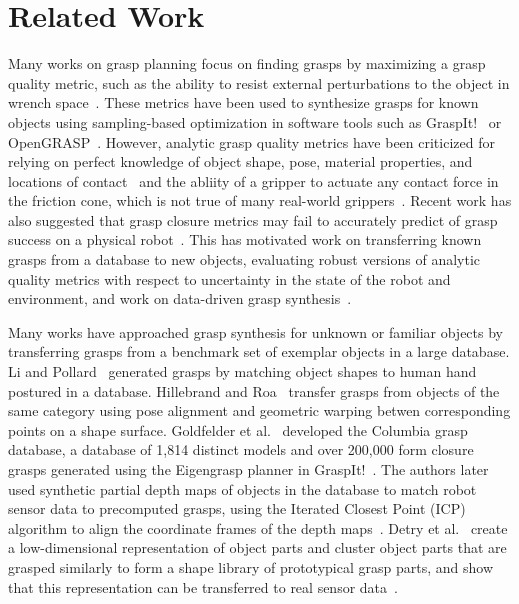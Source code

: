 \section{Related Work}

Many works on grasp planning focus on finding grasps by maximizing a grasp quality metric, such as the ability to resist external perturbations to the object in wrench space~\cite{ferrari1992, miller2004graspit}.
These metrics have been used to synthesize grasps for known objects using sampling-based optimization in software tools such as GraspIt!~\cite{miller2004graspit} or OpenGRASP~\cite{}.
However, analytic grasp quality metrics have been criticized for relying on perfect knowledge of object shape, pose, material properties, and locations of contact~\cite{cheong2011output} and the abliity of a gripper to actuate any contact force in the friction cone, which is not true of many real-world grippers~\cite{}.
Recent work has also suggested that grasp closure metrics may fail to accurately predict of grasp success on a physical robot~\cite{balasubmaranian, weisz}.
This has motivated work on transferring known grasps from a database to new objects, evaluating robust versions of analytic quality metrics with respect to uncertainty in the state of the robot and environment, and work on data-driven grasp synthesis~\cite{}.

Many works have approached grasp synthesis for unknown or familiar objects by transferring grasps from a benchmark set of exemplar objects in a large database.
Li and Pollard~\cite{} generated grasps by matching object shapes to human hand postured in a database.
Hillebrand and Roa~\cite{} transfer grasps from objects of the same category using pose alignment and geometric warping betwen corresponding points on a shape surface.
Goldfelder et al.~\cite{} developed the Columbia grasp database, a database of 1,814 distinct models and over 200,000 form closure grasps generated using the Eigengrasp planner in GraspIt!~\cite{ciocarlie2009}.
The authors later used synthetic partial depth maps of objects in the database to match robot sensor data to precomputed grasps, using the Iterated Closest Point (ICP) algorithm to align the coordinate frames of the depth maps~\cite{partial}.
Detry et al.~\cite{91inbohg} create a low-dimensional representation of object parts and cluster object parts that are grasped similarly to form a shape library of prototypical grasp parts, and show that this representation can be transferred to real sensor data~\cite{}.

